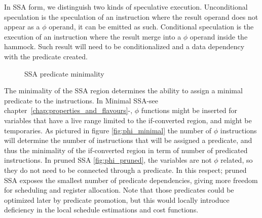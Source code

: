In SSA form, we distinguish two kinds of speculative execution. Unconditional speculation is the speculation of an instruction where the result operand does not appear as a $\phi$ operand, it can be emitted as such. Conditional speculation is the execution of an instruction where the result merge into a $\phi$ operand inside the hammock. Such result will need to be conditionalized and a data dependency with the predicate created.

\begin{figure}[h]
\centering
\caption{SSA predicate minimality}
\label{fig:minimality}
\end{figure}

The minimality of the SSA region determines the ability to assign a minimal predicate to the instructions. In Minimal SSA-see chapter~\ref{chap:properties_and_flavours}-, $\phi$ functions might be inserted for variables that have a live range limited to the if-converted region, and might be temporaries. As pictured in figure \ref{fig:phi_minimal} the number of $\phi$ instructions will determine the number of instructions that will be assigned a predicate, and thus the minimality of the if-converted region in term of number of predicated instructions. In pruned SSA \ref{fig:phi_pruned}, the variables are not $\phi$ related, so they do not need to be connected through a predicate. In this respect; pruned SSA exposes the smallest number of predicate dependencies, giving more freedom for scheduling and register allocation. Note that those predicates could be optimized later by predicate promotion, but this would locally introduce deficiency in the local schedule estimations and cost functions.

